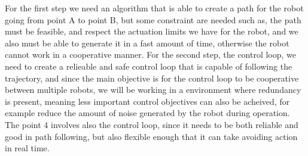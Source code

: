 For the first step we need an algorithm that is able to create a path for the robot going from point A to point B, but some constraint are needed such as, the path must be feasible, and respect the actuation limits we have for the robot, and we also must be able to generate it in a fast amount of time, otherwise the robot cannot work in a cooperative manner. For the second step, the control loop, we need to create a relieable and safe control loop that is capable of following the trajectory, and since the main objective is for the control loop to be cooperative between multiple robots, we will be working in a environment where redundancy is present, meaning less important control objectives can also be acheived, for example reduce the amount of noise generated by the robot during operation. The point 4 involves also the control loop, since it needs to be both reliable and good in path following, but also flexible enough that it can take avoiding action in real time.  


